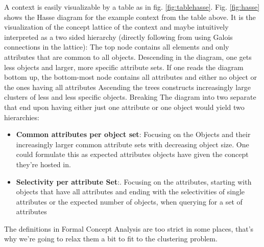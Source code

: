 A context is easily visualizable by a table as in fig. \ref{fig:tablehasse}. Fig. \ref{fig:hasse} shows the Hasse diagram for the example context from the table above. It is the visualization of the concept lattice of the context and maybe intuitively interpreted as a two sided hierarchy (directly following from using Galois connections in the lattice): The top node contains all elements and only attributes that are common to all objects. Descending in the diagram, one gets less objects and larger, more specific attribute sets. If one reads the diagram bottom up, the bottom-most node contains all attributes and either no object or the ones having all attributes Ascending the trees constructs increasingly large clusters of less and less specific objects. Breaking The diagram into two separate that end upon having either just one attribute or one object would yield two hierarchies: 
\begin{itemize}
    \item \textbf{Common attributes per object set}: Focusing on the Objects and their increasingly larger common attribute sets with decreasing object size. One could formulate this as expected attributes objects have given the concept they're hosted in.
    \item \textbf{Selectivity per attribute Set}:. Focusing on the attributes, starting with objects that have all attributes and ending with the selectivities of single attributes or the expected number of objects, when querying for a set of attributes
\end{itemize}


The definitions in Formal Concept Analysis are too strict in some places, that's why we're going to relax them a bit to fit to the clustering problem.~\cite{ignatov2012concept}

